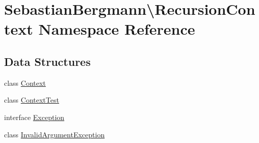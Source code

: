 \hypertarget{namespace_sebastian_bergmann_1_1_recursion_context}{}\section{Sebastian\+Bergmann\textbackslash{}Recursion\+Context Namespace Reference}
\label{namespace_sebastian_bergmann_1_1_recursion_context}
\subsection*{Data Structures}
\begin{DoxyCompactItemize}
\item 
class \mbox{\hyperlink{class_sebastian_bergmann_1_1_recursion_context_1_1_context}{Context}}
\item 
class \mbox{\hyperlink{class_sebastian_bergmann_1_1_recursion_context_1_1_context_test}{Context\+Test}}
\item 
interface \mbox{\hyperlink{interface_sebastian_bergmann_1_1_recursion_context_1_1_exception}{Exception}}
\item 
class \mbox{\hyperlink{class_sebastian_bergmann_1_1_recursion_context_1_1_invalid_argument_exception}{Invalid\+Argument\+Exception}}
\end{DoxyCompactItemize}
